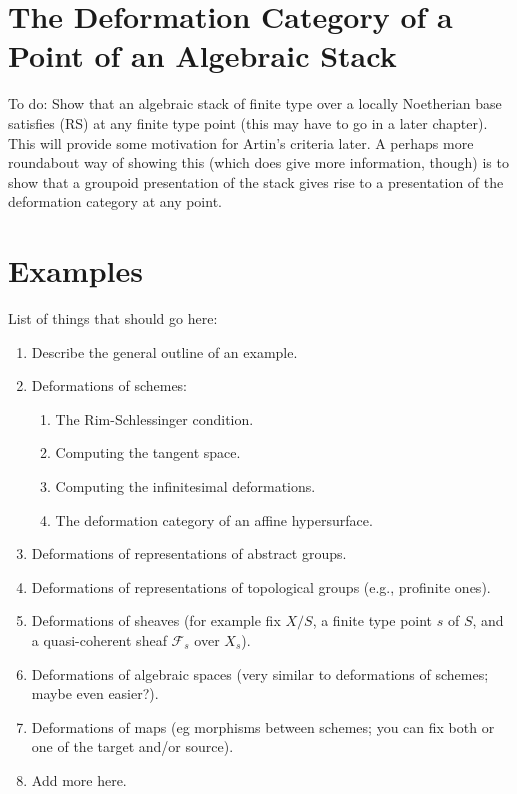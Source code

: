 \section{The Deformation Category of a Point of an Algebraic Stack} 
\label{section-algebraic-stacks}

\noindent
To do: Show that an algebraic stack of finite type over a locally Noetherian
base satisfies (RS) at any finite type point (this may have to go in a later
chapter). This will provide some motivation for Artin's criteria later.
A perhaps more roundabout  way of showing this (which does give more
information, though) is to show that a groupoid presentation of the stack
gives rise to a presentation of the deformation category at any point.




\section{Examples}
\label{section-examples}

\noindent
List of things that should go here:
\begin{enumerate}
\item Describe the general outline of an example.
\item Deformations of schemes:
\begin{enumerate}
\item The Rim-Schlessinger condition.
\item Computing the tangent space.
\item Computing the infinitesimal deformations.
\item The deformation category of an affine hypersurface.
\end{enumerate}
\item Deformations of representations of abstract groups.
\item Deformations of representations of topological groups
(e.g., profinite ones).
\item Deformations of sheaves (for example fix $X/S$, a finite type point
$s$ of $S$, and a quasi-coherent sheaf $\mathcal{F}_s$ over $X_s$).
\item Deformations of algebraic spaces (very similar to deformations
of schemes; maybe even easier?).
\item Deformations of maps (eg morphisms between schemes; you can fix
both or one of the target and/or source).
\item Add more here.
\end{enumerate}








